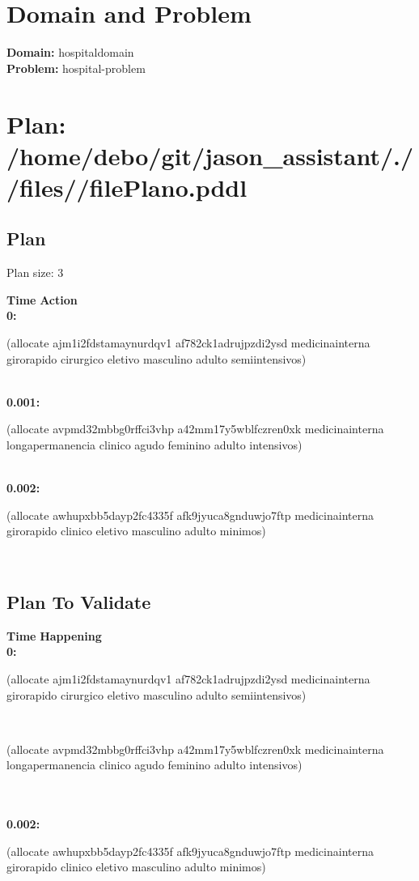 \documentclass[a4paper,12pt]{article}
\author{\mbox{\sc {\sc Val}}}
\newcommand{\headingtimeaction}{{\bf Time} \qquad \= {\bf Action}\\[0.8ex]}
\newcommand{\headingtimehappening}{{\bf Time} \qquad \= {\bf Happening}\\[0.8ex]}
\newcommand{\atime}[1]{{\bf #1:}}
\newcommand{\action}[1]{{\sf #1}}
\newcommand{\listrow}[1]{\begin{minipage}[t]{11.5cm} #1 \end{minipage}}
\begin{document}
 \maketitle 
\section{Domain and Problem}
{\bf Domain:} hospitaldomain\\
{\bf Problem:} hospital-problem
\section{\sloppy Plan: /\-home/\-debo/\-git/\-jason\_assistant/\-./\-/\-files/\-/\-filePlano.pddl}
\subsection{Plan}
Plan size: 3
\begin{tabbing}
\headingtimeaction 
\atime{0} \> \listrow{\action{(allocate ajm1i2fdstamaynurdqv1 af782ck1adrujpzdi2ysd medicinainterna girorapido cirurgico eletivo masculino adulto semiintensivos)}}\\
\atime{0.001} \> \listrow{\action{(allocate avpmd32mbbg0rffci3vhp a42mm17y5wblfczren0xk medicinainterna longapermanencia clinico agudo feminino adulto intensivos)}}\\
\atime{0.002} \> \listrow{\action{(allocate awhupxbb5dayp2fc4335f afk9jyuca8gnduwjo7ftp medicinainterna girorapido clinico eletivo masculino adulto minimos)}}\\
\end{tabbing}
\subsection{Plan To Validate}
\begin{tabbing}
\headingtimehappening 
\atime{0}  \> \listrow{\action{(allocate ajm1i2fdstamaynurdqv1 af782ck1adrujpzdi2ysd medicinainterna girorapido cirurgico eletivo masculino adulto semiintensivos)}}\\ \> \listrow{\action{(allocate avpmd32mbbg0rffci3vhp a42mm17y5wblfczren0xk medicinainterna longapermanencia clinico agudo feminino adulto intensivos)}}\\
\\\atime{0.002}  \> \listrow{\action{(allocate awhupxbb5dayp2fc4335f afk9jyuca8gnduwjo7ftp medicinainterna girorapido clinico eletivo masculino adulto minimos)}}\\
\end{tabbing}
\end{document}
